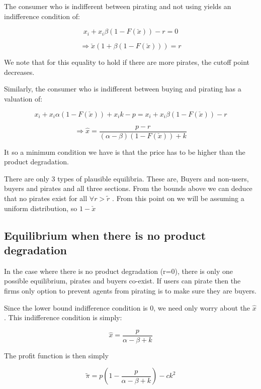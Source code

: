 \documentclass{article}
\begin{document}
The consumer who is indifferent between pirating and not using yields an indifference condition of:

\[
x_i + x_i\beta \left(1-F(\check{x})\right) -r = 0 
\]

\begin{equation} \label{eq:indi1}
\Rightarrow \check{x}(1 + \beta(1-F(\check{x}))) = r
\end{equation}

We note that for this equality to hold if there are more pirates, the cutoff point decreases. 

Similarly, the consumer who is indifferent between buying and pirating has a valuation of:

\[
x_i + x_i\alpha \left( 1-F(\check{x}) \right) + x_i k -p = x_i + x_i\beta \left(1-F(\check{x})\right) -r 
\]

\begin{equation} \label{eq:indi2}
\Rightarrow \hat{x} = \frac{p-r}{(\alpha - \beta)(1 - F(\check{x}))+k}
\end{equation}


It so a minimum condition we have is that the price has to be higher than the product degradation. 

There are only 3 types of plausible equilibria. These are, Buyers and non-users, buyers and pirates and all three sections. From the bounds above we can deduce that no pirates exist for all $\forall r>\tilde{r}$ . From this point on we will be assuming a uniform distribution, so $1-\check{x}$

\subsection{Equilibrium when there is no product degradation}

In the case where there is no product degradation (r=0), there is only one possible equilibrium, pirates and buyers co-exist. If users can pirate then the firms only option to prevent agents from pirating is to make sure they are buyers.

Since the lower bound indifference condition is 0, we need only worry about the $\hat{x}$. This indifference condition is simply:

\begin{equation*}
\hat{x} = \frac{p}{\alpha - \beta +k}
\end{equation*}

The profit function is then simply

\begin{equation*}
\tilde{\pi} = p\left(1-\frac{p}{\alpha - \beta +k}\right)-c k^2
\end{equation*}
\end{document}
